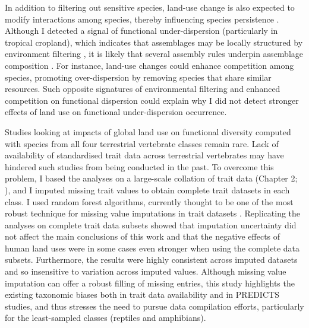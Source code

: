 In addition to filtering out sensitive species, land-use change is also expected to modify interactions among species, thereby influencing species persistence \citep{Tylianakis2008, Valiente-Banuet2015}. Although I detected a signal of functional under-dispersion (particularly in tropical cropland), which indicates that assemblages may be locally structured by environment filtering \citep{Bregman2015}, it is likely that several assembly rules underpin assemblage composition \citep{Fournier2016}. For instance, land-use changes could enhance competition among species, promoting over-dispersion by removing species that share similar resources. Such opposite signatures of environmental filtering and enhanced competition on functional dispersion could explain why I did not detect stronger effects of land use on functional under-dispersion occurrence.

Studies looking at impacts of global land use on functional diversity computed with species from all four terrestrial vertebrate classes remain rare. Lack of availability of standardised trait data across terrestrial vertebrates may have hindered such studies from being conducted in the past. To overcome this problem, I based the analyses on a large-scale collation of trait data (Chapter 2; \citet{Etard2020}), and I imputed missing trait values to obtain complete trait datasets in each class. I used random forest algorithms, currently thought to be one of the most robust technique for missing value imputations in trait datasets \citep{Debastiani2021, Johnson2021, Penone2014}. Replicating the analyses on complete trait data subsets showed that imputation uncertainty did not affect the main conclusions of this work and that the negative effects of human land uses were in some cases even stronger when using the complete data subsets. Furthermore, the results were highly consistent across imputed datasets and so insensitive to variation across imputed values. Although missing value imputation can offer a robust filling of missing entries, this study highlights the existing taxonomic biases both in trait data availability and in PREDICTS studies, and thus stresses the need to pursue data compilation efforts, particularly for the least-sampled classes (reptiles and amphibians).

